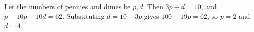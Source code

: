 Let the numbers of pennies and dimes be $p,d$. Then $3p+d=10$, and $p+10p+10d=62$. Substituting $d=10-3p$ gives $100-19p=62$, so $p=2$ and $\boxed{d=4}$.
